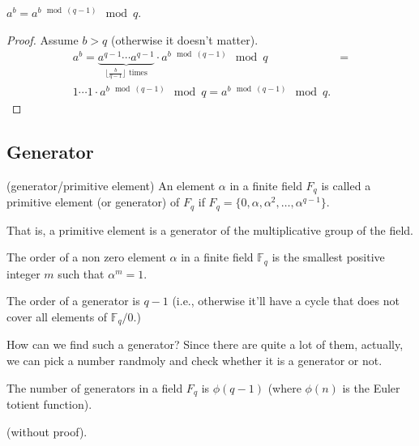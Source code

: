 \begin{corollary}
    $a^b=a^{b\mod (q-1)} \mod q$.
\end{corollary}

\begin{proof}
    Assume $b>q$ (otherwise it doesn't matter).
    \begin{align}
    a^b=
    \underbrace{a^{q-1} \cdots a^{q-1}}_{\lfloor\frac{b}{q-1} \rfloor\text{ times}} \cdot a^{b\mod (q-1)} \mod q &= \\
     1\cdots1 \cdot a^{b\mod (q-1)} \mod q = a^{b\mod (q-1)} \mod q.    
    \end{align}
\end{proof}

\subsection{Generator}

\begin{definition}(generator/primitive element)
    An element $\alpha$ in a finite field $F_q$ is called a primitive element
    (or generator) of $F_q$ if 
    $F_q = \{0, \alpha, \alpha^2, \dots , \alpha^{q-1}\}$.
\end{definition}

That is, a primitive element is a generator of the multiplicative group of the field.

\begin{definition}
    The order of a non zero element $\alpha$ in a finite field $\mathbb{F}_q$ 
    is the smallest positive integer $m$ such that
    $\alpha^m=1$.
\end{definition}

\begin{corollary}
    The order of a generator is $q-1$ (i.e., otherwise it'll have a cycle that does not cover all elements of $\mathbb{F}_q/{0}$.)
\end{corollary}

How can we find such a generator? Since there are quite a lot of them, actually, we can pick a number randmoly and check whether it is a generator or not.


\begin{theorem}
    The number of generators in a field $F_q$ is $\phi(q-1)$ (where $\phi(n)$ is the Euler totient function).
\end{theorem}\label{theorem:num-generators}

(without proof).

